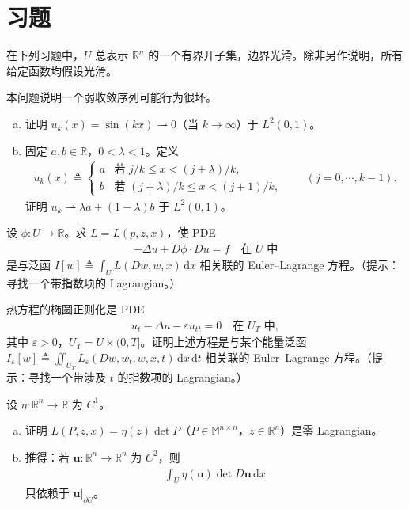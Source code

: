 \documentclass[../../main.tex]{subfiles}
\begin{document}
\section{习题}\label{section:ch08-7-习题}

在下列习题中，$U$ 总表示 $\mathbb{R}^n$ 的一个有界开子集，边界光滑。除非另作说明，所有给定函数均假设光滑。

\begin{exercise}\label{exercise:ch08-7-1}
本问题说明一个弱收敛序列可能行为很坏。
\begin{enumerate}[(a)]
\item 证明 $u_k(x)=\sin(kx)\rightharpoonup 0$（当 $k\to\infty$）于 $L^2(0,1)$。
\item 固定 $a,b\in\mathbb{R}$，$0<\lambda<1$。定义
\begin{align*}
u_k(x)\triangleq\begin{cases}a&\text{若 }j/k\leqslant x<(j+\lambda)/k,\\ b&\text{若 }(j+\lambda)/k\leqslant x<(j+1)/k,\end{cases}\qquad (j=0,\cdots,k-1).
\end{align*}
证明 $u_k\rightharpoonup\lambda a+(1-\lambda)b$ 于 $L^2(0,1)$。
\end{enumerate}
\end{exercise}

\begin{exercise}\label{exercise:ch08-7-2}
设 $\phi:U\to\mathbb{R}$。求 $L=L(p,z,x)$，使 PDE
\begin{align*}
-\Delta u+D\phi\cdot Du=f\quad\text{在 }U\text{ 中}
\end{align*}
是与泛函 $I[w]\triangleq\int_U L(Dw,w,x)\,\mathrm{d}x$ 相关联的 Euler--Lagrange 方程。（提示：寻找一个带指数项的 Lagrangian。）
\end{exercise}

\begin{exercise}\label{exercise:ch08-7-3}
热方程的椭圆正则化是 PDE
\begin{align*}
u_t-\Delta u-\varepsilon u_{tt}=0\quad\text{在 }U_T\text{ 中},
\end{align*}
其中 $\varepsilon>0$，$U_T=U\times(0,T]$。证明上述方程是与某个能量泛函 $I_\varepsilon[w]\triangleq\iint_{U_T}L_\varepsilon(Dw,w_t,w,x,t)\,\mathrm{d}x\,\mathrm{d}t$ 相关联的 Euler--Lagrange 方程。（提示：寻找一个带涉及 $t$ 的指数项的 Lagrangian。）
\end{exercise}

\begin{exercise}\label{exercise:ch08-7-4}
设 $\eta:\mathbb{R}^n\to\mathbb{R}$ 为 $C^1$。
\begin{enumerate}[(a)]
\item 证明 $L(P,z,x)=\eta(z)\det P$（$P\in\mathbb{M}^{n\times n}$，$z\in\mathbb{R}^n$）是零 Lagrangian。
\item 推得：若 $\mathbf{u}:\mathbb{R}^n\to\mathbb{R}^n$ 为 $C^2$，则
\begin{align*}
\int_U\eta(\mathbf{u})\det D\mathbf{u}\,\mathrm{d}x
\end{align*}
只依赖于 $\mathbf{u}|_{\partial U}$。
\end{enumerate}
\end{exercise}
\end{document}
